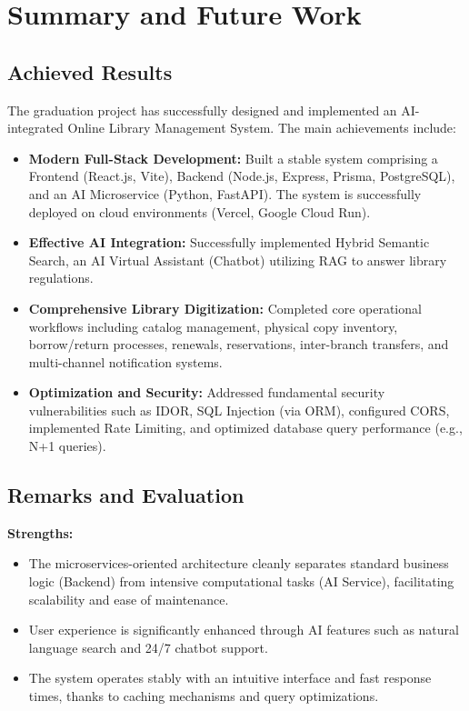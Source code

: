 \section{Summary and Future Work}

\subsection{Achieved Results}
The graduation project has successfully designed and implemented an AI-integrated Online Library Management System. The main achievements include:
\begin{itemize}
    \item \textbf{Modern Full-Stack Development:} Built a stable system comprising a Frontend (React.js, Vite), Backend (Node.js, Express, Prisma, PostgreSQL), and an AI Microservice (Python, FastAPI). The system is successfully deployed on cloud environments (Vercel, Google Cloud Run).
    \item \textbf{Effective AI Integration:} Successfully implemented Hybrid Semantic Search, an AI Virtual Assistant (Chatbot) utilizing RAG to answer library regulations.
    \item \textbf{Comprehensive Library Digitization:} Completed core operational workflows including catalog management, physical copy inventory, borrow/return processes, renewals, reservations, inter-branch transfers, and multi-channel notification systems.
    \item \textbf{Optimization and Security:} Addressed fundamental security vulnerabilities such as IDOR, SQL Injection (via ORM), configured CORS, implemented Rate Limiting, and optimized database query performance (e.g., N+1 queries).
\end{itemize}

\subsection{Remarks and Evaluation}
\textbf{Strengths:}
\begin{itemize}
    \item The microservices-oriented architecture cleanly separates standard business logic (Backend) from intensive computational tasks (AI Service), facilitating scalability and ease of maintenance.
    \item User experience is significantly enhanced through AI features such as natural language search and 24/7 chatbot support.
    \item The system operates stably with an intuitive interface and fast response times, thanks to caching mechanisms and query optimizations.
\end{itemize}

